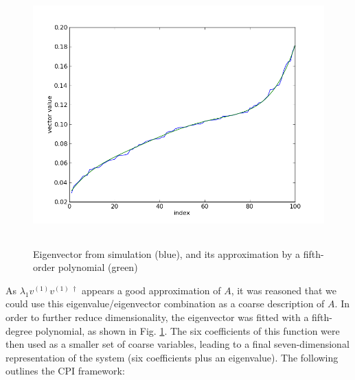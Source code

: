 \documentclass[11pt]{article}
\begin{document}
\clearpage

\begin{figure}[h]
  \centering
  \includegraphics[height=10cm]{eigVectFitting}
  \caption{Eigenvector from simulation (blue), and its approximation by a fifth-order polynomial (green)}
  \label{fig:eigVectFitting}
\end{figure}
As $\lambda_{1}v^{(1)}v^{(1) \;\dagger}$ appears a good approximation of $A$, it was reasoned that we could use this eigenvalue/eigenvector combination as a coarse description of $A$. In order to further reduce dimensionality, the eigenvector was fitted with a fifth-degree polynomial, as shown in Fig. \ref{fig:eigVectFitting}. The six coefficients of this function were then used as a smaller set of coarse variables, leading to a final seven-dimensional representation of the system (six coefficients plus an eigenvalue). The following outlines the CPI framework:
\end{document}
